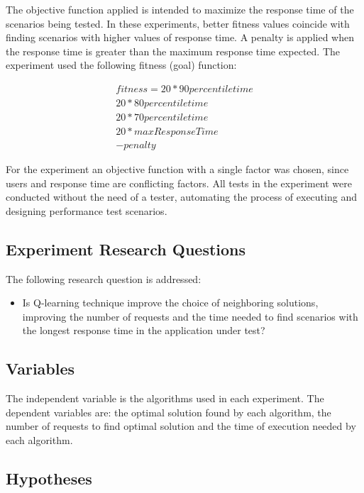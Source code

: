 \documentclass{report}
\begin{document}
The objective function applied is intended to maximize the response time of the scenarios being tested.  In these experiments, better fitness values coincide with finding scenarios with higher values of response time. A penalty is applied when the response time is greater than the  maximum response time expected. The experiment used the following fitness (goal) function:

\begin{equation}
\begin{aligned}
fitness=
20* 90percentiletime\\
20*80percentiletime\\
20*70percentiletime\\
20*maxResponseTime\\
-penalty
\end{aligned}
\end{equation}

For the experiment an objective function with a single factor was chosen, since users and response time are conflicting factors. All tests in the experiment were conducted without the need of a tester, automating the process of executing and designing performance test scenarios.

\subsection{Experiment Research Questions}

The following research question is addressed:

\begin{itemize}
\item Is Q-learning technique improve the choice of neighboring solutions, improving the number of requests and the time needed to find scenarios with the longest response time in the application under test?
\end{itemize}

\subsection{Variables}

The independent variable is the algorithms used in each experiment. The dependent variables are: the optimal solution found by each algorithm, the number of requests to find optimal solution and the time of execution needed by each algorithm.

\subsection{Hypotheses}
\end{document}
